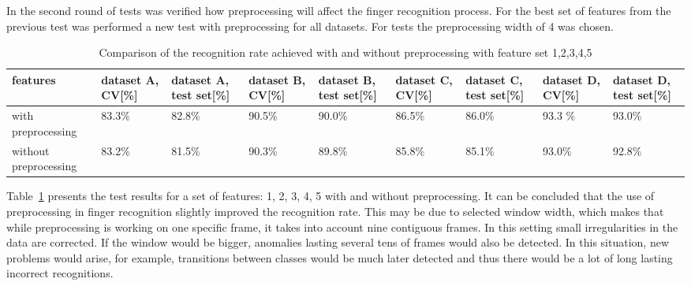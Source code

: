 In the second round of tests was verified how preprocessing will affect the finger recognition process. For the best set of features from the previous test was performed a new test with preprocessing for all datasets. For tests the preprocessing width of 4 was chosen.

\begin{table}[htp!]
\begin{center}
	\label{findiffpre}
	\caption{Comparison of the recognition rate achieved with and without preprocessing with feature set 1,2,3,4,5}
    \begin{tabular}{|p{1.3cm}|p{1.3cm}|p{1.3cm}|p{1.3cm}|p{1.3cm}|p{1.3cm}|p{1.3cm}|p{1.3cm}|p{1.3cm}|}
    \hline
    features & dataset A, CV[\%] & dataset A, test set[\%] & dataset B, CV[\%] & dataset B, test set[\%] & dataset C, CV[\%]& dataset C, test set[\%]  & dataset D, CV[\%] & dataset D, test set[\%]  \\ \hline
    with preprocessing          & 83.3\% & 82.8\%  & 90.5\% & 90.0\% & 86.5\% & 86.0\% & 93.3 \% & 93.0\% \\ \hline
    without preprocessing   	& 83.2\% & 81.5\% & 90.3\%  & 89.8\% & 85.8\% & 85.1\% & 93.0\% & 92.8\% \\ \hline
    \end{tabular}
    \end{center}
\end{table}

Table~\ref{findiffpre} presents the test results for a set of features: 1, 2, 3, 4, 5 with and without preprocessing. It can be concluded that the use of preprocessing in finger recognition slightly improved the recognition rate. This may be due to selected window width, which makes that while preprocessing is working on one specific frame, it takes into account nine contiguous frames. In this setting small irregularities in the data are corrected. If the window would be bigger, anomalies lasting several tens of frames would also be detected. In this situation, new problems would arise, for example, transitions between classes would be much later detected and thus there would be a lot of long lasting incorrect recognitions.




